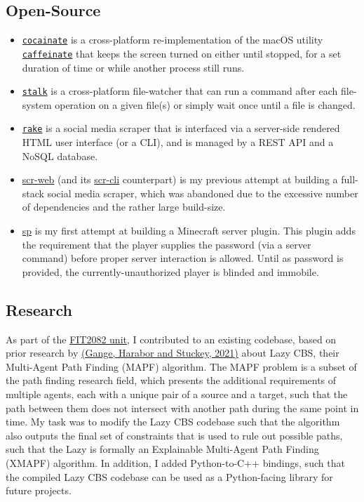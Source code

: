 \documentclass[a4paper]{article}
\begin{document}
	\subsection*{Open-Source}

	\begin{itemize}
		\item \href{https://github.com/AppleGamer22/cocainate}{\texttt{cocainate}} is a cross-platform re-implementation of the macOS utility \href{https://github.com/apple-oss-distributions/PowerManagement/tree/main/caffeinate}{\texttt{caffeinate}} that keeps the screen turned on either until stopped, for a set duration of time or while another process still runs.
		\item \href{https://github.com/AppleGamer22/stalk}{\texttt{stalk}} is a cross-platform file-watcher that can run a command after each file-system operation on a given file(s) or simply wait once until a file is changed.
		\item \href{https://github.com/AppleGamer22/rake}{\texttt{rake}} is a social media scraper that is interfaced via a server-side rendered HTML user interface (or a CLI), and is managed by a REST API and a NoSQL database.
		\item \href{https://github.com/AppleGamer22/scr-web}{scr-web} (and its \href{https://github.com/AppleGamer22/scr-cli}{scr-cli} counterpart) is my previous attempt at building a full-stack social media scraper, which was abandoned due to the excessive number of dependencies and the rather large build-size.
		\item \href{https://github.com/AppleGamer22/sp}{sp} is my first attempt at building a Minecraft server plugin. This plugin adds the requirement that the player supplies the password (via a server command) before proper server interaction is allowed. Until as password is provided, the currently-unauthorized player is blinded and immobile.
	\end{itemize}

	\subsection*{Research}
	As part of the \href{https://handbook.monash.edu/2021/units/FIT2082}{FIT2082 unit}, I contributed to an existing codebase, based on prior research by \href{https://ojs.aaai.org/index.php/ICAPS/article/view/3471}{(Gange, Harabor and Stuckey, 2021)} about Lazy CBS, their Multi-Agent Path Finding (MAPF) algorithm. The MAPF problem is a subset of the path finding research field, which presents the additional requirements of multiple agents, each with a unique pair of a source and a target, such that the path between them does not intersect with another path during the same point in time. My task was to modify the Lazy CBS codebase such that the algorithm also outputs the final set of constraints that is used to rule out possible paths, such that the Lazy is formally an Explainable Multi-Agent Path Finding (XMAPF) algorithm. In addition, I added Python-to-C++ bindings, such that the compiled Lazy CBS codebase can be used as a Python-facing library for future projects.

\end{document}
